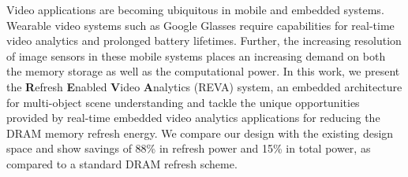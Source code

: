 Video applications are becoming ubiquitous in mobile and embedded systems. Wearable video systems such as Google Glasses require capabilities for real-time video analytics and prolonged battery lifetimes. Further, the increasing resolution of image sensors in these mobile systems places an increasing demand on both the memory storage as well as the computational power. In this work, we present the \textbf{R}efresh \textbf{E}nabled \textbf{V}ideo \textbf{A}nalytics (REVA) system, an embedded architecture for multi-object scene understanding and tackle the unique opportunities provided by real-time embedded video analytics applications for reducing the DRAM memory refresh energy. We compare our design with the existing design space and show savings of 88\% in refresh power and 15\% in total power, as compared to a standard DRAM refresh scheme. 
